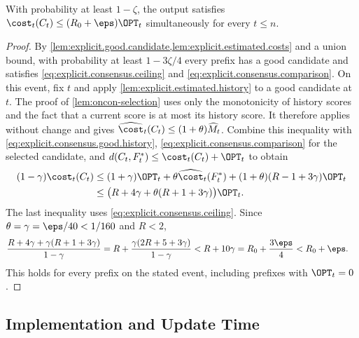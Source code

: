 \begin{lemma}\label{lem:explicit.selected.cost}
With probability at least $ 1-\zeta $, the output satisfies $ \cost_t(C_t)\le(R_0+\eps)\OPT_t $ simultaneously for every $ t\le n $.
\end{lemma}
\begin{proof}
By \cref{lem:explicit.good.candidate,lem:explicit.estimated.costs} and a union bound, with probability at least $ 1-3\zeta/4 $ every prefix has a good candidate and satisfies \eqref{eq:explicit.consensus.ceiling} and \eqref{eq:explicit.consensus.comparison}.
On this event, fix $ t $ and apply \cref{lem:explicit.estimated.history} to a good candidate at $ t $.
The proof of \cref{lem:oncon-selection} uses only the monotonicity of history scores and the fact that a current score is at most its history score.
It therefore applies without change and gives $ \edcost{t}(C_t)\le(1+\theta)\edminimum{t} $.
Combine this inequality with \eqref{eq:explicit.consensus.good.history}, \eqref{eq:explicit.consensus.comparison} for the selected candidate, and $ d(C_t,F_t^*)\le\cost_t(C_t)+\OPT_t $ to obtain
\begin{align}
    (1-\gamma)\cost_t(C_t)
    &\le(1+\gamma)\OPT_t+\theta\edcost{t}(F_t^*)
        +(1+\theta)(R-1+3\gamma)\OPT_t\nonumber\\
    &\le\bigl(R+4\gamma+\theta(R+1+3\gamma)\bigr)\OPT_t.
    \label{eq:explicit.consensus.final.cost}
\end{align}
The last inequality uses \eqref{eq:explicit.consensus.ceiling}.
Since $ \theta=\gamma=\eps/40<1/160 $ and $ R<2 $,
\begin{align}
    \frac{R+4\gamma+\gamma(R+1+3\gamma)}{1-\gamma}
    &=R+\frac{\gamma(2R+5+3\gamma)}{1-\gamma}
    <R+10\gamma
    =R_0+\frac{3\eps}{4}
    <R_0+\eps.
    \nonumber
\end{align}
This holds for every prefix on the stated event, including prefixes with $ \OPT_t=0 $.
\end{proof}

\subsection{Implementation and Update Time}\label{subsec:explicit.consensus.implementation}


